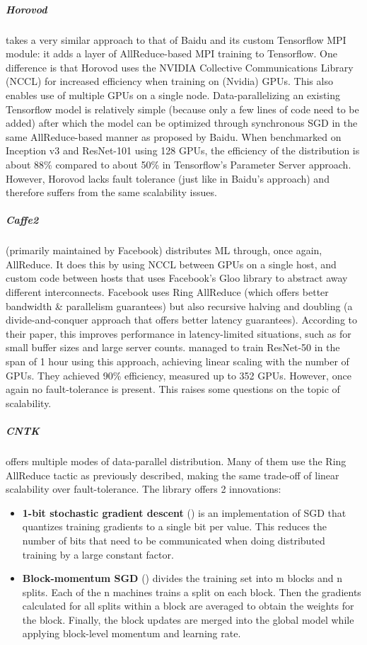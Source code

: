 \subparagraph{Horovod\citep{Horovod2018}}
takes a very similar approach to that of Baidu and its custom Tensorflow MPI module: it adds a layer of AllReduce-based MPI training to Tensorflow. One difference is that Horovod uses the NVIDIA Collective Communications Library (NCCL) for increased efficiency when training on (Nvidia) GPUs. This also enables use of multiple GPUs on a single node. Data-parallelizing an existing Tensorflow model is relatively simple (because only a few lines of code need to be added) after which the model can be optimized through synchronous SGD in the same AllReduce-based manner as proposed by Baidu. When benchmarked on Inception v3\citep{Szegedy2015} and ResNet-101\citep{He2015} using 128 GPUs, the efficiency of the distribution is about 88\% compared to about 50\% in Tensorflow's Parameter Server approach.\\
However, Horovod lacks fault tolerance (just like in Baidu's approach) and therefore suffers from the same scalability issues.

\subparagraph{Caffe2}
(primarily maintained by Facebook) distributes ML through, once again, AllReduce. It does this by using NCCL between GPUs on a single host, and custom code between hosts that uses Facebook's Gloo library to abstract away different interconnects. Facebook uses Ring AllReduce (which offers better bandwidth \& parallelism guarantees) but also recursive halving and doubling (a divide-and-conquer approach that offers better latency guarantees). According to their paper, this improves performance in latency-limited situations, such as for small buffer sizes and large server counts. \citet{He2015} managed to train ResNet-50 in the span of 1 hour\citep{Goyal2017} using this approach, achieving linear scaling with the number of GPUs. They achieved 90\% efficiency, measured up to 352 GPUs. However, once again no fault-tolerance is present. This raises some questions on the topic of scalability.

\subparagraph{CNTK}
offers multiple modes of data-parallel distribution. Many of them use the Ring AllReduce tactic as previously described, making the same trade-off of linear scalability over fault-tolerance. The library offers 2 innovations:
\begin{itemize}
	\item \textbf{1-bit stochastic gradient descent} (\citet{Seide2014}) is an implementation of SGD that quantizes training gradients to a single bit per value. This reduces the number of bits that need to be communicated when doing distributed training by a large constant factor.
	\item \textbf{Block-momentum SGD} (\citet{Chen2016}) divides the training set into m blocks and n splits. Each of the n machines trains a split on each block. Then the gradients calculated for all splits within a block are averaged to obtain the weights for the block. Finally, the block updates are merged into the global model while applying block-level momentum and learning rate.
\end{itemize}

